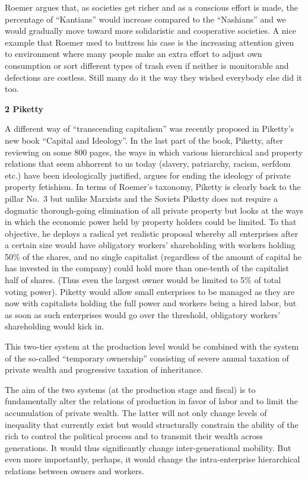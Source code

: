 \documentclass[
]{book}
\begin{document}
Roemer argues that, as societies get richer and as a conscious effort is made, the percentage of ``Kantians'' would increase compared to the ``Nashians'' and we would gradually move toward more solidaristic and cooperative societies. A nice example that Roemer used to buttress his case is the increasing attention given to environment where many people make an extra effort to adjust own consumption or sort different types of trash even if neither is monitorable and defections are costless. Still many do it the way they wished everybody else did it too.

\textbf{2 Piketty}

A different way of ``transcending capitalism'' was recently proposed in Piketty's new book ``Capital and Ideology''. In the last part of the book, Piketty, after reviewing on some 800 pages, the ways in which various hierarchical and property relations that seem abhorrent to us today (slavery, patriarchy, racism, serfdom etc.) have been ideologically justified, argues for ending the ideology of private property fetishism. In terms of Roemer's taxonomy, Piketty is clearly back to the pillar No.~3 but unlike Marxists and the Soviets Piketty does not require a dogmatic thorough-going elimination of all private property but looks at the ways in which the economic power held by property holders could be limited. To that objective, he deploys a radical yet realistic proposal whereby all enterprises after a certain size would have obligatory workers' shareholding with workers holding 50\% of the shares, and no single capitalist (regardless of the amount of capital he has invested in the company) could hold more than one-tenth of the capitalist half of shares. (Thus even the largest owner would be limited to 5\% of total voting power). Piketty would allow small enterprises to be managed as they are now with capitalists holding the full power and workers being a hired labor, but as soon as such enterprises would go over the threshold, obligatory workers' shareholding would kick in.

This two-tier system at the production level would be combined with the system of the so-called ``temporary ownership'' consisting of severe annual taxation of private wealth and progressive taxation of inheritance.

The aim of the two systems (at the production stage and fiscal) is to fundamentally alter the relations of production in favor of labor and to limit the accumulation of private wealth. The latter will not only change levels of inequality that currently exist but would structurally constrain the ability of the rich to control the political process and to transmit their wealth across generations. It would thus significantly change inter-generational mobility. But even more importantly, perhaps, it would change the intra-enterprise hierarchical relations between owners and workers.
\end{document}
